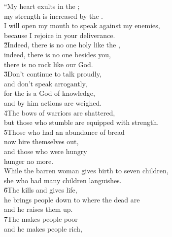 \begin{poetry}
\poeml ``My heart exults in the ; \\
\poemll    my strength is increased by the . \\
\poeml I will open my mouth to speak against my enemies, \\
\poemll    because I rejoice in your deliverance. \\
\poeml \v{2}Indeed, there is no one holy like the , \\
\poemll    indeed, there is no one besides you, \\
\poeml there is no rock like our God. \\
\poeml \v{3}Don't continue to talk proudly, \\
\poemll    and don't speak arrogantly, \\
\poeml for the  is a God of knowledge, \\
\poemll    and by him actions are weighed. \\
\poeml \v{4}The bows of warriors are shattered, \\
\poemll    but those who stumble are equipped with strength. \\
\poeml \v{5}Those who had an abundance of bread \\
\poemll    now hire themselves out, \\
\poeml and those who were hungry \\
\poemll    hunger no more. \\
\poeml While the barren woman gives birth to seven children, \\
\poemll    she who had many children languishes. \\
\poeml \v{6}The  kills and gives life, \\
\poemll    he brings people down to where the dead are \\
\poemlll       and he raises them up. \\
\poeml \v{7}The  makes people poor \\
\poemll    and he makes people rich, \\

\end{poetry}
